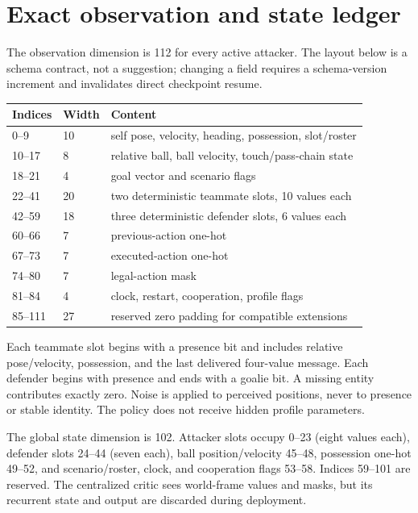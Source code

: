 \documentclass[12pt,twocolumn]{article}
\begin{document}
\section{Exact observation and state ledger}
The observation dimension is 112 for every active attacker. The layout below is a schema contract,
not a suggestion; changing a field requires a schema-version increment and invalidates direct
checkpoint resume.
\begin{center}
\scriptsize
\begin{tabular}{p{}p{}p{}}
\toprule Indices & Width & Content \\
\midrule
0--9 & 10 & self pose, velocity, heading, possession, slot/roster \\
10--17 & 8 & relative ball, ball velocity, touch/pass-chain state \\
18--21 & 4 & goal vector and scenario flags \\
22--41 & 20 & two deterministic teammate slots, 10 values each \\
42--59 & 18 & three deterministic defender slots, 6 values each \\
60--66 & 7 & previous-action one-hot \\
67--73 & 7 & executed-action one-hot \\
74--80 & 7 & legal-action mask \\
81--84 & 4 & clock, restart, cooperation, profile flags \\
85--111 & 27 & reserved zero padding for compatible extensions \\
\bottomrule
\end{tabular}
\normalsize
\end{center}
Each teammate slot begins with a presence bit and includes relative pose/velocity, possession, and
the last delivered four-value message. Each defender begins with presence and ends with a goalie
bit. A missing entity contributes exactly zero. Noise is applied to perceived positions, never to
presence or stable identity. The policy does not receive hidden profile parameters.

The global state dimension is 102. Attacker slots occupy 0--23 (eight values each), defender slots
24--44 (seven each), ball position/velocity 45--48, possession one-hot 49--52, and scenario/roster,
clock, and cooperation flags 53--58. Indices 59--101 are reserved. The centralized critic sees
world-frame values and masks, but its recurrent state and output are discarded during deployment.
\end{document}
